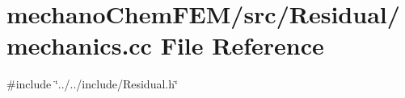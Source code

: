 \section{mechano\+Chem\+F\+E\+M/src/\+Residual/mechanics.cc File Reference}
\label{mechanics_8cc}
{\ttfamily \#include \char`\"{}../../include/\+Residual.\+h\char`\"{}}\newline
